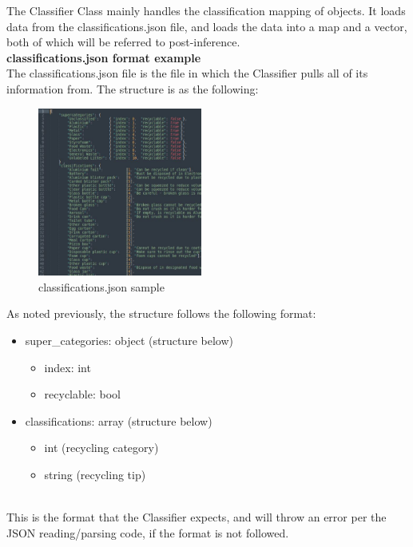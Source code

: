 \documentclass[conference]{IEEEtran}
\begin{document}
The Classifier Class mainly handles the classification mapping of objects. It loads data from the classifications.json file, and loads the data into a map and a vector, both of which will be referred to post-inference.\\


\textbf{classifications.json format example}~\\

The classifications.json file is the file in which the Classifier pulls all of its information from. The structure is as the following:

\begin{figure}[h]
    \centering
    \includegraphics[width=0.48\textwidth]{images/sourcecode/classifications_json.eps}
    \caption{classifications.json sample}
\end{figure}

As noted previously, the structure follows the following format:

\begin{itemize}
\item super\_categories: object (structure below)
\begin{itemize}
\item index: int
\item recyclable: bool
\end{itemize}
\item classifications: array (structure below)
\begin{itemize}
\item int (recycling category)
\item string (recycling tip)
\end{itemize}
\end{itemize}~\\

This is the format that the Classifier expects, and will throw an error per the JSON reading/parsing code, if the format is not followed.~\\~\\
\end{document}
